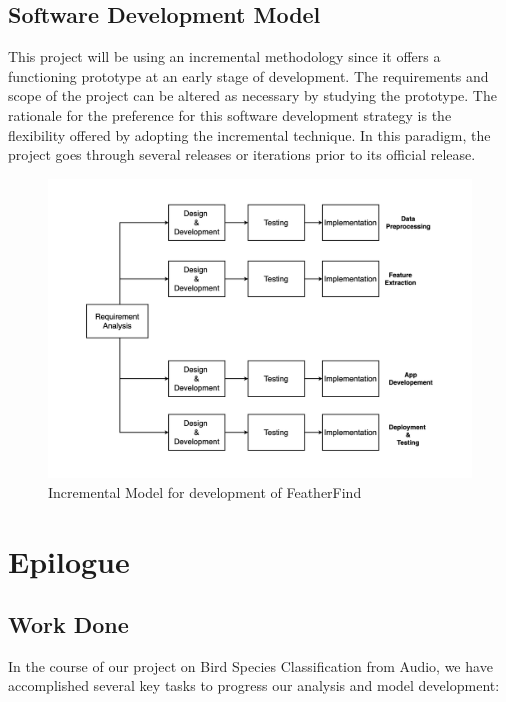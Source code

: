 \newpage
\section{Software Development Model}
This project will be using an incremental methodology since it offers a
functioning prototype at an early stage of development. The requirements and
scope of the project can be altered as necessary by studying the prototype. The
rationale for the preference for this software development strategy is the
flexibility offered by adopting the incremental technique. In this paradigm,
the project goes through several releases or iterations prior to its official
release.
\begin{figure}[h!]
    \includegraphics[scale=0.25]{images/SDLC.png}
    \caption{Incremental Model for development of
        FeatherFind}%
\end{figure}
\newpage

\chapter{Epilogue}
\section{Work Done}
In the course of our project on Bird Species Classification from Audio, we have accomplished several key tasks to progress our analysis and model development:

